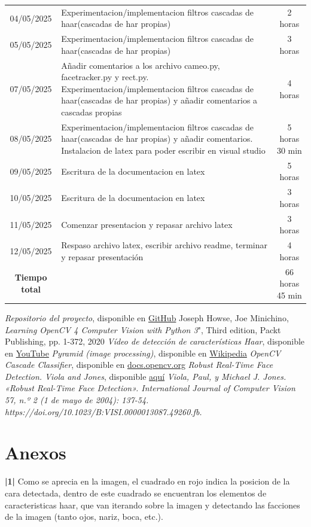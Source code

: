 \documentclass[a4paper]{article}
\begin{document}
\begin{table}[H]
\begin{tabular}{|c|p{10cm}|c|}
04/05/2025 & Experimentacion/implementacion filtros cascadas de haar(cascadas de har propias) & 2 horas \\
05/05/2025 & Experimentacion/implementacion filtros cascadas de haar(cascadas de har propias) & 3 horas \\
07/05/2025 & Añadir comentarios a los archivo cameo.py, facetracker.py y rect.py. Experimentacion/implementacion filtros cascadas de haar(cascadas de har propias) y añadir comentarios a cascadas propias & 4 horas \\
08/05/2025 & Experimentacion/implementacion filtros cascadas de haar(cascadas de har propias) y añadir comentarios. Instalacion de latex para poder escribir en visual studio & 5 horas 30 min \\
09/05/2025 & Escritura de la documentacion en latex & 5 horas \\
10/05/2025 & Escritura de la documentacion en latex & 3 horas \\
11/05/2025 & Comenzar presentacion y repasar archivo latex & 3 horas \\
12/05/2025 & Respaso archivo latex, escribir archivo readme, terminar y repasar presentación & 4 horas \\
\textbf{Tiempo total} & & 66 horas 45 min\\
\hline
\end{tabular}
\end{table}

\newpage
\begin{thebibliography}{99}
 \textit{Repositorio del proyecto}, disponible en \href{https://github.com/PacktPublishing/Learning-OpenCV-4-Computer-Vision-with-Python-Third-Edition}{GitHub}
 Joseph Howse, Joe Minichino, \textit{Learning OpenCV 4 Computer Vision with Python 3}", Third edition, Packt Publishing, pp. 1-372, 2020
 \textit{Vídeo de detección de características Haar}, disponible en \href{https://youtu.be/hPCTwxF0qf4}{YouTube}
 \textit{Pyramid (image processing)}, disponible en \href{https://en.wikipedia.org/wiki/Pyramid_(image_processing)}{Wikipedia}
 \textit{OpenCV Cascade Classifier}, disponible en \href{https://docs.opencv.org/3.4/db/d28/tutorial_cascade_classifier.html}{docs.opencv.org}
 \textit{Robust Real-Time Face Detection. Viola and Jones}, disponible \href{https://www.face-rec.org/algorithms/Boosting-Ensemble/16981346.pdf}{aquí}
 \textit{Viola, Paul, y Michael J. Jones. «Robust Real-Time Face Detection». International Journal of Computer Vision 57, n.º 2 (1 de mayo de 2004): 137-54. https://doi.org/10.1023/B:VISI.0000013087.49260.fb.
}
\end{thebibliography}


\newpage
\section*{Anexos}
\textbf{|1|} Como se aprecia en la imagen, el cuadrado en rojo indica la posicion de la cara detectada, dentro de este cuadrado se encuentran los elementos de caracteristicas haar, que van iterando sobre la imagen y detectando las facciones de la imagen (tanto ojos, nariz, boca, etc.).
\end{document}
